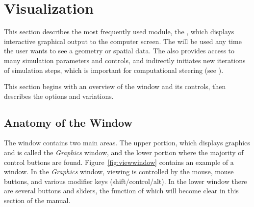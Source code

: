   \newcommand{\boxwidget}%
  {\centerline{\epsfig{file=Figures/widget-box.eps.gz,height=2in,
  bbllx=0, bblly=0, bburx=458, bbury=342}}}
\begin{htmlonly}
  \newcommand{\boxwidget}{%
  \htmladdimg[align=top,width=459,alt="boxwidget"]
  {../Figures/widget-box.gif}}
\end{htmlonly}

  \newcommand{\ringwidget}%
  {\centerline{\epsfig{file=Figures/widget-ring.eps.gz,height=2in,
  bbllx=0, bblly=0, bburx=507, bbury=467}}}
\begin{htmlonly}
  \newcommand{\ringwidget}{%
  \htmladdimg[align=top,width=508,alt="ringwidget"]
  {../Figures/widget-ring.gif}}
\end{htmlonly}

\newcommand{\graphics}{\emph{Graphics}}

\chapter{Visualization}
\label{ch:viewer}

This section describes the most frequently used \sr{} module,
the \viewer{}, which displays interactive graphical
output to the computer screen.  The \viewer{} will be used any time the user
wants to see a geometry or spatial data. The \viewer{} also provides access to
many simulation parameters and controls, and indirectly initiates new
iterations of  simulation steps, which is important for computational steering (see ).

This section begins with an overview of the \viewer{} window and its
controls, then describes the options and variations.

\section{Anatomy of the \viewer{} Window}
\label{sec:viewer-anatomy} 

The \viewer{} window contains two main areas.  The upper portion,
which displays graphics and is called the \graphics{} window, and the
lower portion where the majority of control buttons are found.
Figure~\ref{fig:viewwindow} contains an example of a \viewer{} window.
In the \graphics{} window, viewing is controlled by the mouse, mouse
buttons, and various modifier keys (shift/control/alt).  In the lower
window there are several buttons and sliders, the function of which
will become clear in this section of the manual.

